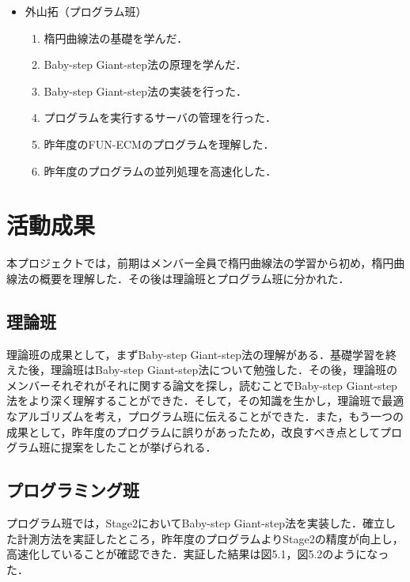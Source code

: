 \documentclass[openany,11pt,papersize]{jsbook}
\begin{document}
\begin{itemize}
\item 外山拓（プログラム班）
 \begin{enumerate}
 \renewcommand{\labelenumi}{(\arabic{enumi})}
 \item 楕円曲線法の基礎を学んだ．
 \item Baby-step Giant-step法の原理を学んだ．
 \item Baby-step Giant-step法の実装を行った．
 \item プログラムを実行するサーバの管理を行った．
 \item 昨年度のFUN-ECMのプログラムを理解した．
 \item 昨年度のプログラムの並列処理を高速化した．
 \end{enumerate}
 
\end{itemize}


\chapter{活動成果}

本プロジェクトでは，前期はメンバー全員で楕円曲線法の学習から初め，楕円曲線法の概要を理解した．その後は理論班とプログラム班に分かれた．

\section{理論班}

理論班の成果として，まずBaby-step Giant-step法の理解がある．基礎学習を終えた後，理論班はBaby-step Giant-step法について勉強した．その後，理論班のメンバーそれぞれがそれに関する論文を探し，読むことでBaby-step Giant-step法をより深く理解することができた．そして，その知識を生かし，理論班で最適なアルゴリズムを考え，プログラム班に伝えることができた．また，もう一つの成果として，昨年度のプログラムに誤りがあったため，改良すべき点としてプログラム班に提案をしたことが挙げられる．


\section{プログラミング班}
プログラム班では，Stage2においてBaby-step Giant-step法を実装した．確立した計測方法を実証したところ，昨年度のプログラムよりStage2の精度が向上し，高速化していることが確認できた．実証した結果は図5.1，図5.2のようになった．\par
\end{document}

